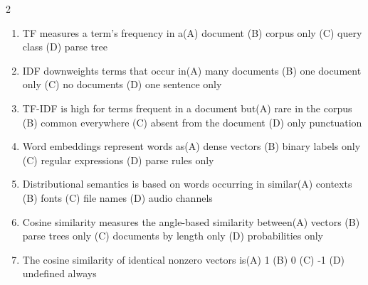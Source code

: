 \documentclass[a4paper]{article}
\begin{document}
\begin{multicols*}{2}
\begin{enumerate}
\item TF measures a term's frequency in a\newline\hspace*{0.6em}(A) document \quad (B) corpus only \newline\hspace*{0.6em}(C) query class \quad (D) parse tree
\item IDF downweights terms that occur in\newline\hspace*{0.6em}(A) many documents \quad (B) one document only \newline\hspace*{0.6em}(C) no documents \quad (D) one sentence only
\item TF-IDF is high for terms frequent in a document but\newline\hspace*{0.6em}(A) rare in the corpus \quad (B) common everywhere \newline\hspace*{0.6em}(C) absent from the document \quad (D) only punctuation
\item Word embeddings represent words as\newline\hspace*{0.6em}(A) dense vectors \quad (B) binary labels only \newline\hspace*{0.6em}(C) regular expressions \quad (D) parse rules only
\item Distributional semantics is based on words occurring in similar\newline\hspace*{0.6em}(A) contexts \quad (B) fonts \newline\hspace*{0.6em}(C) file names \quad (D) audio channels
\item Cosine similarity measures the angle-based similarity between\newline\hspace*{0.6em}(A) vectors \quad (B) parse trees only \newline\hspace*{0.6em}(C) documents by length only \quad (D) probabilities only
\item The cosine similarity of identical nonzero vectors is\newline\hspace*{0.6em}(A) 1 \quad (B) 0 \newline\hspace*{0.6em}(C) -1 \quad (D) undefined always

\end{enumerate}
\end{multicols*}
\end{document}
